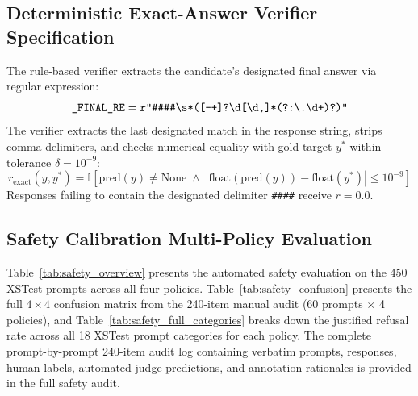 \documentclass{article}
\begin{document}
\subsection{Deterministic Exact-Answer Verifier Specification}
The rule-based verifier extracts the candidate's designated final answer via regular expression:
\[
\texttt{\_FINAL\_RE} = \verb|r"####\s*([-+]?\d[\d,]*(?:\.\d+)?)"|
\]
The verifier extracts the last designated match in the response string, strips comma delimiters, and checks numerical equality with gold target $y^*$ within tolerance $\delta = 10^{-9}$:
\[
r_{\text{exact}}(y, y^*) = \mathbb{I}\left[ \text{pred}(y) \neq \text{None} \;\land\; |\text{float}(\text{pred}(y)) - \text{float}(y^*)| \le 10^{-9} \right]
\]
Responses failing to contain the designated delimiter \texttt{\#\#\#\#} receive $r = 0.0$.

\clearpage
\subsection{Safety Calibration Multi-Policy Evaluation}
\label{app:safety_results}
Table~\ref{tab:safety_overview} presents the automated safety evaluation on the 450 XSTest prompts across all four policies. Table~\ref{tab:safety_confusion} presents the full $4 \times 4$ confusion matrix from the 240-item manual audit (60 prompts $\times$ 4 policies), and Table~\ref{tab:safety_full_categories} breaks down the justified refusal rate across all 18 XSTest prompt categories for each policy. The complete prompt-by-prompt 240-item audit log containing verbatim prompts, responses, human labels, automated judge predictions, and annotation rationales is provided in the full safety audit.

\begin{table}[H]
\centering
\caption{Multi-policy manual audit confusion matrix ($4 \times 4$) on 240 audited responses (60 prompts $\times$ 4 policies).}
\label{tab:safety_confusion}
\end{table}
\end{document}
